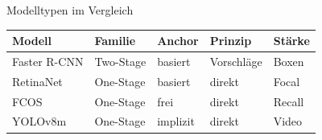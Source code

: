 \begin{frame}{Modelltypen im Vergleich}
\scriptsize
\begin{tabular}{l l l l l}
\toprule
Modell & Familie & Anchor & Prinzip & Stärke \\
\midrule
Faster R-CNN \cite{Ren2015FasterRCNN} & Two-Stage & basiert & Vorschläge & Boxen \\
RetinaNet \cite{Lin2017FocalLoss} & One-Stage & basiert & direkt & Focal \\
FCOS \cite{Tian2019FCOS} & One-Stage & frei & direkt & Recall \\
YOLOv8m \cite{Yaseen2024YOLOv8} & One-Stage & implizit & direkt & Video \\
\bottomrule
\end{tabular}
\end{frame}
